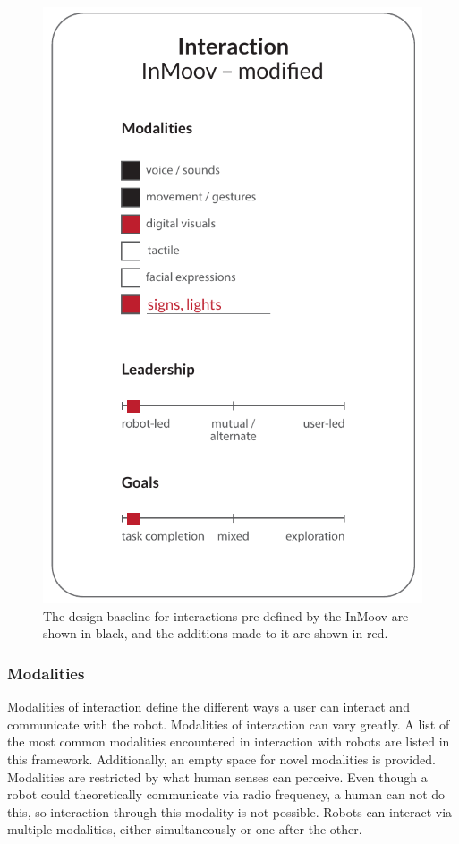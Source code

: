 \begin{figure}
\centering
  \includegraphics[scale=0.75]{images/solution_inmoov_final-04.pdf}
  \caption{The design baseline for interactions pre-defined by the InMoov are shown in black, and the additions made to it are shown in red.}
  \label{fig:interactionFinal}
\end{figure}



\subsubsection{Modalities}

Modalities of interaction define the different ways a user can interact and communicate with the robot. Modalities of interaction can vary greatly. A list of the most common modalities encountered in interaction with robots are listed in this framework. Additionally, an empty space for novel modalities is provided. Modalities are restricted by what human senses can perceive. Even though a robot could theoretically communicate via radio frequency, a human can not do this, so interaction through this modality is not possible. Robots can interact via multiple modalities, either simultaneously or one after the other.

